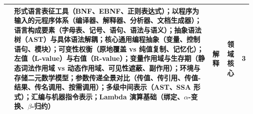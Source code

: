\begin{tabularx}{\textwidth}{p{} Y c c c}
\midrule
{} 
& 形式语言表征工具（BNF、EBNF、正则表达式）；以程序为输入的元程序体系（编译器、解释器、分析器、文档生成器）；语言构成要素（字母表、记号、语句、语法与语义）；抽象语法树（AST）与具体语法解耦；核心通用编程抽象（变量、控制语句、模块）；可变性权衡（原地覆盖 vs 纯值复制、记忆化）；左值（L-value）与右值（R-value）；变量作用域与生存期（静态词法作用域 vs 动态作用域、可见性遮蔽、副作用）；环境与存储二元数学模型；参数传递全景对比（传值、传引用、传值-结果、传名调用、按需调用）；多级中间表示（AST、SSA 形式）；汇编与机器指令表示；Lambda 演算基础（绑定、$\alpha$-变换、$\beta$-归约） & 解释 & 领域核心 & 3 \\
\bottomrule
\end{tabularx}
\clearpage
\twocolumn